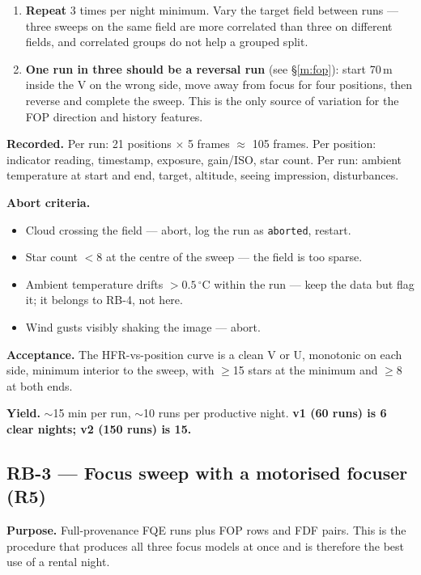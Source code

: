 \documentclass[11pt]{article}
\newcommand{\co}[1]{\texttt{\small #1}}
\begin{document}
\begin{enumerate}
\item \textbf{Repeat} 3 times per night minimum. Vary the target field between
      runs --- three sweeps on the same field are more correlated than three on
      different fields, and correlated groups do not help a grouped split.

\item \textbf{One run in three should be a reversal run} (see \S\ref{m:fop}): start
      70\,\textmu m inside the V on the wrong side, move away from focus for
      four positions, then reverse and complete the sweep. This is the only
      source of variation for the FOP direction and history features.
\end{enumerate}

\textbf{Recorded.} Per run: 21 positions $\times$ 5 frames $\approx$ 105 frames.
Per position: indicator reading, timestamp, exposure, gain/ISO, star count.
Per run: ambient temperature at start and end, target, altitude, seeing
impression, disturbances.

\textbf{Abort criteria.}
\begin{itemize}
\item Cloud crossing the field --- abort, log the run as \co{aborted}, restart.
\item Star count $<8$ at the centre of the sweep --- the field is too sparse.
\item Ambient temperature drifts $>0.5\,^\circ$C within the run --- keep the
      data but flag it; it belongs to RB-4, not here.
\item Wind gusts visibly shaking the image --- abort.
\end{itemize}

\textbf{Acceptance.} The HFR-vs-position curve is a clean V or U, monotonic on
each side, minimum interior to the sweep, with $\geq$15 stars at the minimum and
$\geq$8 at both ends.

\textbf{Yield.} $\sim$15 min per run, $\sim$10 runs per productive night.
\textbf{v1 (60 runs) is 6 clear nights; v2 (150 runs) is 15.}

\subsection*{RB-3 --- Focus sweep with a motorised focuser (R5)}

\textbf{Purpose.} Full-provenance FQE runs plus FOP rows and FDF pairs. This is
the procedure that produces all three focus models at once and is therefore the
best use of a rental night.
\end{document}
